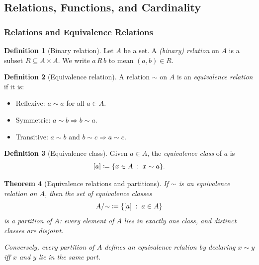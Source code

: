 \documentclass[12pt]{article}
\numberwithin{equation}{section}
\DeclarePairedDelimiter{\set}{\{}{\}}
\newcommand{\st}{\;:\;}                      %
\theoremstyle{plain}
\newtheorem{theorem}{Theorem}[section]
\theoremstyle{definition}
\newtheorem{definition}[theorem]{Definition}
\theoremstyle{remark}
\begin{document}
\subsection{Relations, Functions, and Cardinality}

\subsubsection{Relations and Equivalence Relations}

\begin{definition}[Binary relation]
Let $A$ be a set. A \emph{(binary) relation} on $A$ is a subset $R\subseteq A\times A$.  
We write $a\,R\,b$ to mean $(a,b)\in R$.
\end{definition}

\begin{definition}[Equivalence relation]
A relation $\sim$ on $A$ is an \emph{equivalence relation} if it is:
\begin{itemize}
  \item Reflexive: $a\sim a$ for all $a\in A$.
  \item Symmetric: $a\sim b \Rightarrow b\sim a$.
  \item Transitive: $a\sim b$ and $b\sim c \Rightarrow a\sim c$.
\end{itemize}
\end{definition}

\begin{definition}[Equivalence class]
Given $a\in A$, the \emph{equivalence class} of $a$ is
\[
[a] \coloneqq \set*{x\in A \st x\sim a}.
\]
\end{definition}

\begin{theorem}[Equivalence relations and partitions]\label{thm:eq-partition}
If $\sim$ is an equivalence relation on $A$, then the set of equivalence classes
\[
A/{\sim} \coloneqq \set*{[a] \st a\in A}
\]
is a partition of $A$: every element of $A$ lies in exactly one class, and distinct classes are disjoint.

Conversely, every partition of $A$ defines an equivalence relation by declaring $x\sim y$ iff $x$ and $y$ lie in the same part.
\end{theorem}
\end{document}
